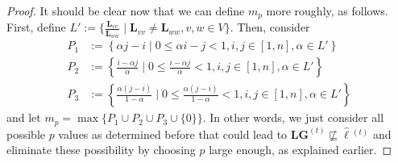 \begin{proof}
It should be clear now that we can define $m_p$ more roughly, as follows.
First, define $L':=\{\frac{\mathbf{L}_{vv}}{\mathbf{L}_{ww}}\mid \mathbf{L}_{vv}\neq\mathbf{L}_{ww}, v,w\in V\}$. Then, consider
\begin{align*}
P_1&:=\left\{ \alpha j -i \mid 0\leq \alpha i -j < 1, i,j\in[1,n],\alpha\in L'\right\}\\
P_2&:=\left\{ \frac{i -\alpha j}{\alpha} \mid 0\leq \frac{i -\alpha j}{\alpha} < 1, i,j\in[1,n],\alpha\in L'\right\}\\
P_3&:=\left\{ \frac{\alpha(j-i)}{1-\alpha} \mid 0\leq \frac{\alpha(j-i)}{1-\alpha} < 1, i,j\in[1,n],\alpha\in L'\right\}
\end{align*}
and let $m_p=\max\{P_1\cup P_2\cup P_3\cup\{0\}\}$. In other words, we just consider all possible $p$ values as determined before that could lead to 
$\mathbf{L}\mathbf{G}^{(t)}\not\sqsubseteq\hat{\pmb{\ell}}{}^{(t)}$ and eliminate these possibility by choosing $p$ large enough, as explained earlier.
%
%
%
%
%
%

\end{proof}
